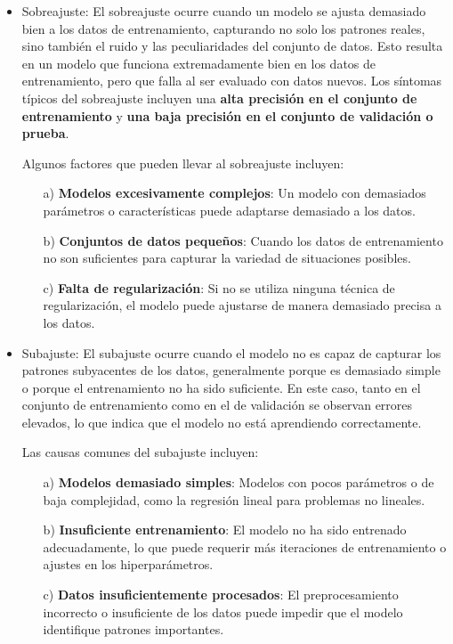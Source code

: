 \documentclass[a4paper]{report} %
\begin{document}
\begin{itemize}

\item Sobreajuste: El sobreajuste ocurre cuando un modelo se ajusta demasiado bien a los datos de entrenamiento, capturando no solo los patrones reales, sino también el ruido y las peculiaridades del conjunto de datos. Esto resulta en un modelo que funciona extremadamente bien en los datos de entrenamiento, pero que falla al ser evaluado con datos nuevos. Los síntomas típicos del sobreajuste incluyen una \textbf{alta precisión en el conjunto de entrenamiento} y \textbf{una baja precisión en el conjunto de validación o prueba}.

Algunos factores que pueden llevar al sobreajuste incluyen:
\begin{itemize} 
\item[a) ] \textbf{Modelos excesivamente complejos}: Un modelo con demasiados parámetros o características puede adaptarse demasiado a los datos. 
\item[b) ] \textbf{Conjuntos de datos pequeños}: Cuando los datos de entrenamiento no son suficientes para capturar la variedad de situaciones posibles.
 \item[c) ] \textbf{Falta de regularización}: Si no se utiliza ninguna técnica de regularización, el modelo puede ajustarse de manera demasiado precisa a los datos. 
 \end{itemize}

\item Subajuste:  El subajuste ocurre cuando el modelo no es capaz de capturar los patrones subyacentes de los datos, generalmente porque es demasiado simple o porque el entrenamiento no ha sido suficiente. En este caso, tanto en el conjunto de entrenamiento como en el de validación se observan errores elevados, lo que indica que el modelo no está aprendiendo correctamente.

Las causas comunes del subajuste incluyen: 
\begin{itemize}
\item[a) ] \textbf{Modelos demasiado simples}: Modelos con pocos parámetros o de baja complejidad, como la regresión lineal para problemas no lineales. 
\item[b) ] \textbf{Insuficiente entrenamiento}: El modelo no ha sido entrenado adecuadamente, lo que puede requerir más iteraciones de entrenamiento o ajustes en los hiperparámetros. 
\item[c) ] \textbf{Datos insuficientemente procesados}: El preprocesamiento incorrecto o insuficiente de los datos puede impedir que el modelo identifique patrones importantes. \end{itemize}
\end{itemize}
\end{document}
